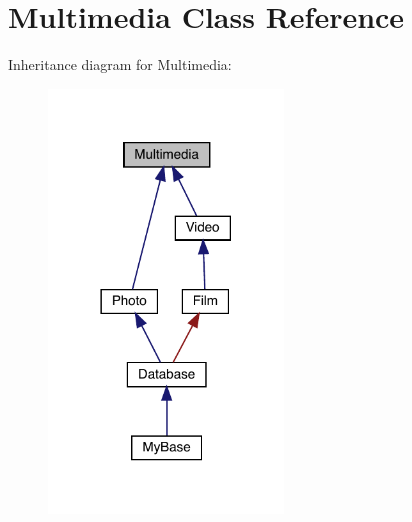 \hypertarget{class_multimedia}{}\section{Multimedia Class Reference}
\label{class_multimedia}


Inheritance diagram for Multimedia\+:
\nopagebreak
\begin{figure}[H]
\begin{center}
\leavevmode
\includegraphics[width=177pt]{class_multimedia__inherit__graph}
\end{center}
\end{figure}
